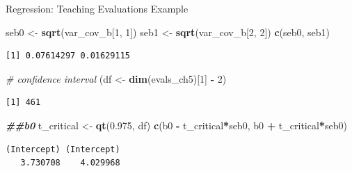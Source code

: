 \documentclass[
  ignorenonframetext,
]{beamer}
\newenvironment{Shaded}{\begin{snugshade}}{\end{snugshade}}
\newcommand{\CommentTok}[1]{\textcolor[rgb]{0.56,0.35,0.01}{\textit{#1}}}
\newcommand{\DecValTok}[1]{\textcolor[rgb]{0.00,0.00,0.81}{#1}}
\newcommand{\DocumentationTok}[1]{\textcolor[rgb]{0.56,0.35,0.01}{\textbf{\textit{#1}}}}
\newcommand{\FloatTok}[1]{\textcolor[rgb]{0.00,0.00,0.81}{#1}}
\newcommand{\FunctionTok}[1]{\textcolor[rgb]{0.13,0.29,0.53}{\textbf{#1}}}
\newcommand{\NormalTok}[1]{#1}
\newcommand{\OtherTok}[1]{\textcolor[rgb]{0.56,0.35,0.01}{#1}}
\newcommand{\SpecialCharTok}[1]{\textcolor[rgb]{0.81,0.36,0.00}{\textbf{#1}}}
\begin{document}
\begin{frame}[fragile]{Regression: Teaching Evaluations Example}
\protect{}\label{regression-teaching-evaluations-example-11}
\normalsize

\begin{Shaded}
\begin{Highlighting}[]
\NormalTok{seb0 }\OtherTok{\textless{}{-}} \FunctionTok{sqrt}\NormalTok{(var\_cov\_b[}\DecValTok{1}\NormalTok{, }\DecValTok{1}\NormalTok{])}
\NormalTok{seb1 }\OtherTok{\textless{}{-}} \FunctionTok{sqrt}\NormalTok{(var\_cov\_b[}\DecValTok{2}\NormalTok{, }\DecValTok{2}\NormalTok{])}
\FunctionTok{c}\NormalTok{(seb0, seb1)}
\end{Highlighting}
\end{Shaded}

\begin{verbatim}
[1] 0.07614297 0.01629115
\end{verbatim}

\begin{Shaded}
\begin{Highlighting}[]
\CommentTok{\# confidence interval}
\NormalTok{(df }\OtherTok{\textless{}{-}} \FunctionTok{dim}\NormalTok{(evals\_ch5)[}\DecValTok{1}\NormalTok{] }\SpecialCharTok{{-}} \DecValTok{2}\NormalTok{)}
\end{Highlighting}
\end{Shaded}

\begin{verbatim}
[1] 461
\end{verbatim}

\begin{Shaded}
\begin{Highlighting}[]
\DocumentationTok{\#\#b0}
\NormalTok{t\_critical }\OtherTok{\textless{}{-}} \FunctionTok{qt}\NormalTok{(}\FloatTok{0.975}\NormalTok{, df)}
\FunctionTok{c}\NormalTok{(b0 }\SpecialCharTok{{-}}\NormalTok{ t\_critical}\SpecialCharTok{*}\NormalTok{seb0, b0 }\SpecialCharTok{+}\NormalTok{ t\_critical}\SpecialCharTok{*}\NormalTok{seb0)}
\end{Highlighting}
\end{Shaded}

\begin{verbatim}
(Intercept) (Intercept) 
   3.730708    4.029968 
\end{verbatim}

\normalsize
\end{frame}
\end{document}
